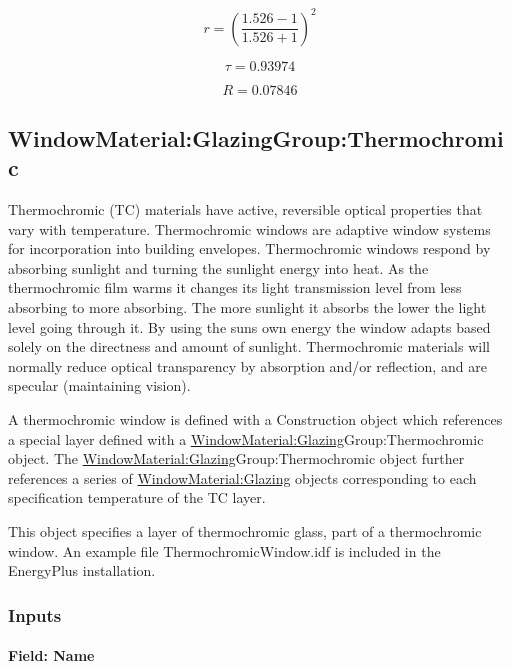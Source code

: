 \begin{equation*}
r = \left( \frac{1.526 - 1}{1.526 + 1} \right)^2
\end{equation*}

\begin{equation*}
\tau = 0.93974
\end{equation*}

\begin{equation*}
R = 0.07846
\end{equation*}

\subsection{WindowMaterial:GlazingGroup:Thermochromic}\label{windowmaterialglazinggroupthermochromic}

Thermochromic (TC) materials have active, reversible optical properties that vary with temperature. Thermochromic windows are adaptive window systems for incorporation into building envelopes. Thermochromic windows respond by absorbing sunlight and turning the sunlight energy into heat. As the thermochromic film warms it changes its light transmission level from less absorbing to more absorbing. The more sunlight it absorbs the lower the light level going through it. By using the suns own energy the window adapts based solely on the directness and amount of sunlight. Thermochromic materials will normally reduce optical transparency by absorption and/or reflection, and are specular (maintaining vision).

A thermochromic window is defined with a Construction object which references a special layer defined with a \hyperref[windowmaterialglazing]{WindowMaterial:Glazing}Group:Thermochromic object. The \hyperref[windowmaterialglazing]{WindowMaterial:Glazing}Group:Thermochromic object further references a series of \hyperref[windowmaterialglazing]{WindowMaterial:Glazing} objects corresponding to each specification temperature of the TC layer.

This object specifies a layer of thermochromic glass, part of a thermochromic window. An example file ThermochromicWindow.idf is included in the EnergyPlus installation.

\subsubsection{Inputs}\label{inputs-15-015}

\paragraph{Field: Name}\label{field-name-9-017}


